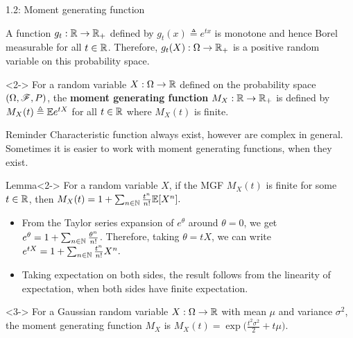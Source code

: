 \documentclass[12pt,aspectratio=169]{beamer}
\begin{document}
\begin{frame}{1.2: Moment generating function}


\begin{Example} 
A function $g_t: \mathbb{R} \to \mathbb{R}_+$ defined by $g_t(x) \triangleq e^{t x}$ is monotone and hence Borel measurable for all $t \in \mathbb{R}$. 
Therefore, $g_t(X): \Omega \to \mathbb{R}_+$ is a positive random variable on this probability space.  
\end{Example} 

\begin{Definition}<2->
For a random variable $X: \Omega \to \mathbb{R}$ defined on the probability space $(\Omega, \mathscr{F}, P)$, 
the \textbf{moment generating function} $M_X: \mathbb{R} \to \mathbb{R}_+$ is defined by $M_X(t) \triangleq \mathbb{E} e^{t X}$ for all $t \in \mathbb{R}$ where $M_X(t)$ is finite. 
\end{Definition}
\end{frame}

\begin{frame}

\begin{block}{Reminder}
Characteristic function always exist, however are complex in general.  
Sometimes it is easier to work with moment generating functions, when they exist. 
\end{block}
\begin{block}{Lemma}<2->
For a random variable $X$, 
if the MGF $M_X(t)$ is finite for some $t \in \mathbb{R}$, 
then $M_X(t) = 1 + \sum_{n \in \mathbb{N}} \frac{t^n}{n!}\mathbb{E}[X^n].$
\end{block}
\end{frame}
\begin{frame}
\begin{Proof} 
\begin{itemize}
\item <1-> From the Taylor series expansion of $e^\theta$ around $\theta = 0$, we get $e^\theta = 1 +  \sum_{n \in \mathbb{N}} \frac{\theta^n}{n!}$. 
Therefore, taking $\theta = tX$, we can write 
$
e^{tX}= 1 +  \sum_{n \in \mathbb{N}} \frac{t^n}{n!}X^n.
$
\item <2-> Taking expectation on both sides, the result follows from the linearity of expectation, when both sides have finite expectation. 
\end{itemize}
\end{Proof}

\begin{Example}<3->
For a Gaussian random variable $X: \Omega \to \mathbb{R}$ with mean $\mu$ and variance $\sigma^2$, 
the moment generating function $M_X$ is 
$
M_X(t) = \exp\Big(\frac{t^2\sigma^2}{2}+t\mu\Big).
$
\end{Example}
\end{frame}
\end{document}
